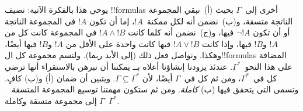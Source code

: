 \documentclass[../../../include/open-logic-section]{subfiles}
\begin{document}
يوحي هذا بالفكرة الآتية: نضيف !!{formula}s أخرى إلى~$\Gamma$ بحيث
(أ)~نبقي المجموعة الناتجة متسقة، و(ب)~نضمن أنه لكل
 ممكنة~$!A$، إما أن تكون $!A$
في المجموعة الناتجة أو أن تكون
$\lnot !A$ فيها، و(ج)~نضمن أنه كلما كانت $!A \land !B$ في المجموعة
كانت كل من $!A$ و$!B$ فيها، وإذا كانت $!A \lor !B$ فيها كانت واحدة
على الأقل من $!A$ و$!B$ فيها أيضًا، وهكذا. ونواصل فعل ذلك (إلى الأبد
ربما). ولنسم مجموعة كل ال!!{formula}s المضافة على هذا النحو~$\Gamma^*$.
عندئذ يزودنا إنشاؤنا أعلاه بــ
يمكننا أن نبرهن بالاستقراء أنها ترضي كل
 في~$\Gamma^*$، ومن ثم كل
 في~$\Gamma$ أيضًا، لأن
$\Gamma \subseteq \Gamma^*$. ويتبين أن ضمان (أ) و(ب) كافٍ. وتسمى
 التي يتحقق
فيها (ب) \emph{كاملة}. ومن ثم ستكون مهمتنا توسيع المجموعة المتسقة
~$\Gamma$ إلى مجموعة متسقة وكاملة~$\Gamma^*$.
\end{document}
